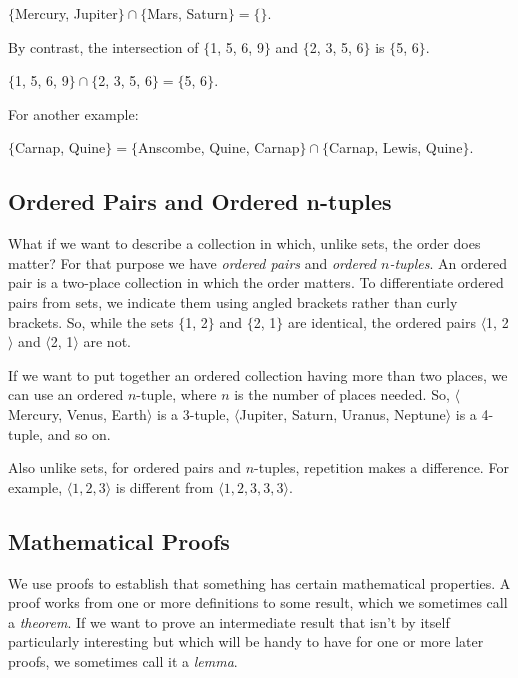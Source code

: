 \begin{center}
	\noindent{}$\{$Mercury, Jupiter$\}\cap\{$Mars, Saturn$\}=\{ \}$.
\end{center}

\noindent{}By contrast, the intersection of $\{$1, 5, 6, 9$\}$ and $\{$2, 3, 5, 6$\}$ is $\{$5, 6$\}$.

\begin{center}
	\noindent{}$\{$1, 5, 6, 9$\}\cap\{$2, 3, 5, 6$\}=\{$5, 6$\}$.
\end{center}

\noindent{}For another example:

\begin{center}
	\noindent{}$\{$Carnap, Quine$\}=\{$Anscombe, Quine, Carnap$\}\cap\{$Carnap, Lewis, Quine$\}$.
\end{center}

\subsection{Ordered Pairs and Ordered n-tuples}\label{orderedpairs}

What if we want to describe a collection in which, unlike sets, the order does matter?  For that purpose we have \emph{ordered pairs} and \emph{ordered $n$-tuples}.  An ordered pair is a two-place collection in which the order matters.  To differentiate ordered pairs from sets, we indicate them using angled brackets rather than curly brackets.  So, while the sets $\{$1, 2$\}$ and $\{$2, 1$\}$ are identical, the ordered pairs $\langle$1, 2$\rangle$ and $\langle$2, 1$\rangle$ are not.

If we want to put together an ordered collection having more than two places, we can use an ordered $n$-tuple, where $n$ is the number of places needed.  So, $\langle$Mercury, Venus, Earth$\rangle$ is a 3-tuple, $\langle$Jupiter, Saturn, Uranus, Neptune$\rangle$ is a 4-tuple, and so on.

Also unlike sets, for ordered pairs and $n$-tuples, repetition makes a difference. For example, $\langle 1, 2, 3\rangle$ is different from $\langle 1, 2, 3, 3, 3\rangle$.

\subsection{Mathematical Proofs}\label{Mathematical Proofs}

We use proofs to establish that something has certain mathematical properties. 
A proof works from one or more definitions to some result, which we sometimes call a \emph{theorem}. 
If we want to prove an intermediate result that isn't by itself particularly interesting but which will be handy to have for one or more later proofs, we sometimes call it a \emph{lemma}.


